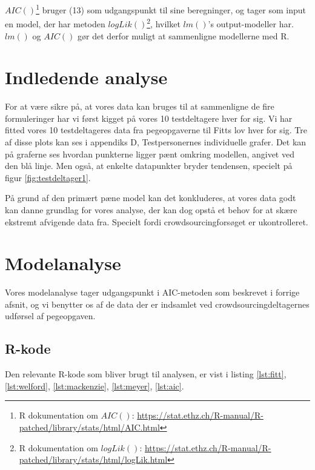 $AIC()$\footnote{R dokumentation om $AIC()$: \url{https://stat.ethz.ch/R-manual/R-patched/library/stats/html/AIC.html}} bruger (13) som udgangspunkt til sine beregninger, og tager som input en model, der har metoden $logLik()$\footnote{R dokumentation om $logLik()$: \url{https://stat.ethz.ch/R-manual/R-patched/library/stats/html/logLik.html}}, hvilket $lm()$'s output-modeller har. $lm()$ og $AIC()$ gør det derfor muligt at sammenligne modellerne med R.

\section*{Indledende analyse}
For at være sikre på, at vores data kan bruges til at sammenligne de fire formuleringer har vi først kigget på vores 10 testdeltagere hver for sig. Vi har fitted vores 10 testdeltageres data fra pegeopgaverne til Fitts lov hver for sig. Tre af disse plots kan ses i appendiks D, Testpersonernes individuelle grafer.  Det kan på graferne ses hvordan punkterne ligger pænt omkring modellen, angivet ved den blå linje. Men også, at enkelte datapunkter bryder tendensen, specielt på figur \ref{fig:testdeltager1}. 

På grund af den primært pæne model kan det konkluderes, at vores data godt kan danne grundlag for vores analyse, der kan dog opstå et behov for at skære ekstremt afvigende data fra. Specielt fordi crowdsourcingforsøget er ukontrolleret.

\section*{Modelanalyse}
Vores modelanalyse tager udgangspunkt i AIC-metoden som beskrevet i forrige afsnit, og vi benytter os af de data der er indsamlet ved crowdsourcingdeltagernes udførsel af pegeopgaven.

\subsection*{R-kode}
Den relevante R-kode som bliver brugt til analysen, er vist i listing \ref{lst:fitt}, \ref{lst:welford}, \ref{lst:mackenzie}, \ref{lst:meyer}, \ref{lst:aic}.







